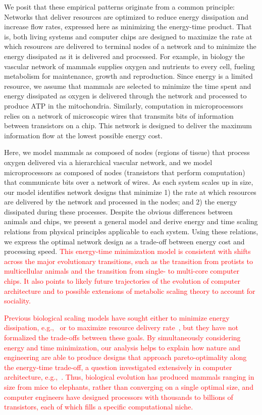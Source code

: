 \documentclass[12pt]{article}
\newcommand{\red}[1]{\textcolor{red}{#1}}
\begin{document}
We posit that these empirical patterns originate from a common principle:
Networks that deliver resources are optimized to reduce energy dissipation and
increase flow rates, expressed here as minimizing the energy-time product. That
is, both living systems and computer chips are designed to maximize the rate at
which resources are delivered to terminal nodes of a network and to minimize
the energy dissipated as it is delivered and processed.  For example, in biology the vascular network of mammals supplies oxygen and nutrients to every cell, fueling metabolism for
maintenance, growth and reproduction.  Since energy is a limited resource, we
assume that mammals are selected to minimize the time spent and energy dissipated as oxygen is delivered through the network \cite{west97} and processed to produce ATP in the mitochondria. Similarly, computation in microprocessors relies on a
network of microscopic wires that transmits bits of information between
transistors on a chip. This network is designed to deliver the maximum information
flow at the lowest possible energy cost.

Here, we model mammals as composed of nodes (regions of tissue) that process oxygen
delivered via a hierarchical vascular network, and we model
microprocessors as composed of nodes (transistors that perform computation) that communicate
bits over a network of wires.  As each system scales up in size,
our model identifies network designs that minimize 1) the rate at which resources are delivered by the network and
processed in the nodes; and 2) the energy dissipated during these processes.
Despite the obvious differences between animals and chips, we present a
general model and derive energy and time scaling relations from physical
principles applicable to each system. Using these relations, we express the
optimal network design as a trade-off between energy cost and processing speed. \red{This energy-time minimization model is consistent with shifts across the major
evolutionary transitions,
such as the transition from protists to
multicellular animals and the transition from single- to multi-core
computer chips.
It also points to likely future trajectories of the evolution of
computer architecture and to possible extensions of metabolic scaling
theory to account for sociality.}


\red{Previous biological scaling models have sought either to minimize energy dissipation, e.g.,~\cite{west97} or to maximize resource delivery rate~\cite{banavar10}, but they have
not formalized the trade-offs between these goals.  By simultaneously considering energy and time minimization, our analysis
helps to explain how nature and engineering are able to produce designs that
approach pareto-optimality along the energy-time trade-off, a question investigated extensively in computer architecture, e.g.,~\cite{horowitz2005scaling, azizi2010energy}. Thus, biological
evolution has produced mammals ranging in size from mice to elephants, rather
than converging on a single optimal size, and computer engineers have designed processors with thousands to
billions of transistors, each of which fills a specific computational niche.}
\end{document}
